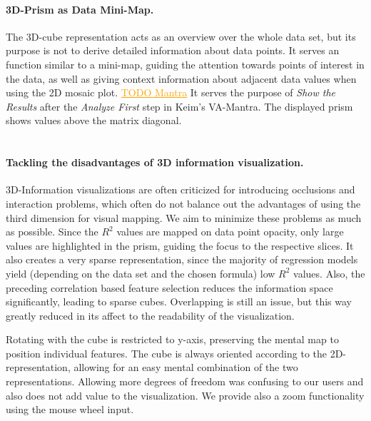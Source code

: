 \documentclass[journal]{style/vgtc} 			          %
\newcommand{\com}[1]{\textcolor{orange}{\uline{#1}}}
\begin{document}
\paragraph{3D-Prism as Data Mini-Map.}
The 3D-cube representation acts as an overview over the whole data set, but its purpose is not to derive detailed information about data points.
It serves an function similar to a mini-map, guiding the attention towards points of interest in the data, as well as giving context information about adjacent data values when using the 2D mosaic plot.
\com{TODO Mantra}
It serves the purpose of \emph{Show the Results} after the \emph{Analyze First} step in Keim's VA-Mantra.
The displayed prism shows values above the matrix diagonal.
\\\\
\paragraph{Tackling the disadvantages of 3D information visualization.}
3D-Information visualizations are often criticized for introducing occlusions and interaction problems, which often do not balance out the advantages of using the third dimension for visual mapping.
We aim to minimize these problems as much as possible.
Since the $R^2$ values are mapped on data point opacity, only large values are highlighted in the prism, guiding the focus to the respective slices.
It also creates a very sparse representation, since the majority of regression models yield (depending on the data set and the chosen formula) low $R^2$ values.
Also, the preceding correlation based feature selection reduces the information space significantly, leading to sparse cubes.
Overlapping is still an issue, but this way greatly reduced in its affect to the readability of the visualization.

Rotating with the cube is restricted to y-axis, preserving the mental map to position individual features.
The cube is always oriented according to the 2D-representation, allowing for an easy mental combination of the two representations.
Allowing more degrees of freedom was confusing to our users and also does not add value to the visualization.
We provide also a zoom functionality using the mouse wheel input.
\end{document}

